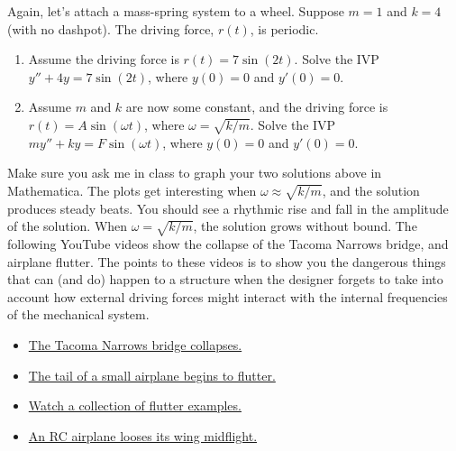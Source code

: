 \begin{problem}
%
Again, let's attach a mass-spring system to a wheel. Suppose $m=1$ and $k=4$ (with no dashpot). 
The driving force, $r(t)$, is periodic. 
\begin{enumerate}
 \item Assume the driving force is $r(t) =7 \sin(2t)$. Solve the IVP $y''+4y=7\sin(2t)$, where $y(0)=0$ and $y'(0)=0$. 
 \item Assume $m$ and $k$ are now some constant, and the driving force is $r(t) = A\sin(\omega t)$, where $\omega = \sqrt{k/m}$. Solve the IVP $my''+ky=F\sin(\omega t)$, where $y(0)=0$ and $y'(0)=0$.
\end{enumerate}
\end{problem}

Make sure you ask me in class to graph your two solutions above in Mathematica. The plots get interesting when $\omega\approx \sqrt{k/m}$, and the solution produces steady beats. You should see a rhythmic rise and fall in the amplitude of the solution.  When $\omega =  \sqrt{k/m}$, the solution grows without bound. The following YouTube videos show the collapse of the Tacoma Narrows bridge, and airplane flutter. The points to these videos is to show you the dangerous things that can (and do) happen to a structure when the designer forgets to take into account how external driving forces might interact with the internal frequencies of the mechanical system.
\begin{itemize}
 \item \href{http://www.youtube.com/watch?v=xox9BVSu7Ok}{The Tacoma Narrows bridge collapses.}
 \item \href{http://www.youtube.com/watch?v=iTFZNrTYp3k}{The tail of a small airplane begins to flutter.}
 \item \href{http://www.youtube.com/watch?v=OhwLojNerMU}{Watch a collection of flutter examples.}
 \item \href{http://www.youtube.com/watch?v=lczhD2nUedY}{An RC airplane looses its wing midflight.}
\end{itemize}

